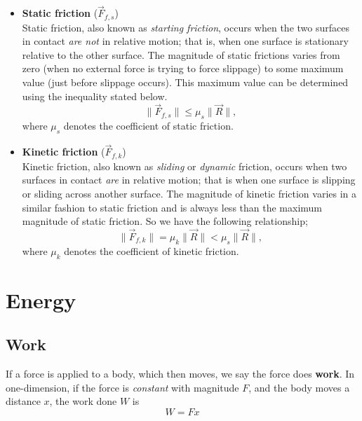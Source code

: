\begin{itemize}
    \item \textbf{Static friction} ($\vec{F}_{f, s}$) \\
    Static friction, also known as \textit{starting friction}, occurs when the two surfaces in contact \textit{are not} in relative motion; that is, when one surface is stationary relative to the other surface. The magnitude of static frictions varies from zero (when no external force is trying to force slippage) to some maximum value (just before slippage occurs). This maximum value can be determined using the inequality stated below.
    \begin{equation}
        \| \vec{F}_{f, s} \| \leq \mu_s \| \vec{R} \|,
    \end{equation}
    where $\mu_s$ denotes the coefficient of static friction.
    \item \textbf{Kinetic friction} ($\vec{F}_{f, k}$) \\
    Kinetic friction, also known as \textit{sliding} or \textit{dynamic} friction, occurs when two surfaces in contact \textit{are} in relative motion; that is when one surface is slipping or sliding across another surface. The magnitude of kinetic friction varies in a similar fashion to static friction and is always less than the maximum magnitude of static friction. So we have the following relationship;
    \begin{equation}
        \| \vec{F}_{f, k} \| = \mu_k \| \vec{R} \| < \mu_s \| \vec{R} \|,
    \end{equation}
    where $\mu_k$ denotes the coefficient of kinetic friction.
    
    
\end{itemize}


\section{Energy}

\subsection{Work}

If a force is applied to a body, which then moves, we say the force does \textbf{work}. In one-dimension, if the force is \textit{constant} with magnitude $F$, and the body moves a distance $x$, the work done $W$ is 
\begin{equation}
    W = Fx
\end{equation}

